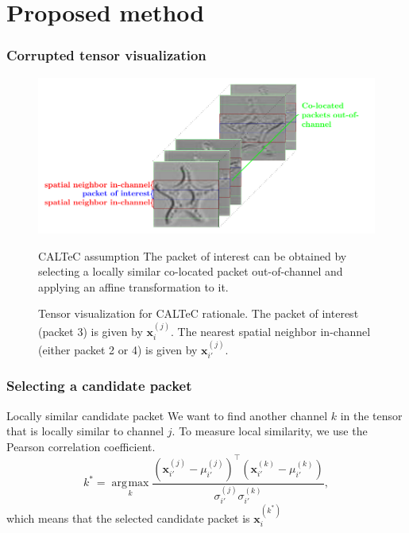 \documentclass[aspectratio=169]{beamer}
\DeclareMathOperator*{\argmax}{\arg\!\max}
\begin{document}
\section{Proposed method}

\begin{frame}
	\frametitle{Corrupted tensor visualization}
	\begin{figure}
		\begin{minipage}{.64\textwidth}
			\includegraphics[width=\linewidth]{tensorvizcaltec.pdf}
			\caption{Tensor visualization for CALTeC rationale. The packet of interest (packet 3) is given by $\mathbf{x}_i^{(j)}$. The nearest spatial neighbor in-channel (either packet 2 or 4) is given by $\mathbf{x}_{i'}^{(j)}$.}
		\end{minipage}\hfill
		\begin{minipage}{.32\textwidth}
				\begin{block}{CALTeC assumption}
		The packet of interest can be obtained by selecting a locally similar co-located packet out-of-channel and applying an affine transformation to it. 
	\end{block}
		\end{minipage}
	\end{figure}
\end{frame}

\begin{frame}
	\frametitle{Selecting a candidate packet}
	\begin{block}{Locally similar candidate packet}
		We want to find another channel $k$ in the tensor that is locally similar to channel $j$. To measure local similarity, we use the Pearson correlation coefficient.
		\[
		 k^* = \underset{k}{\argmax} \frac{\left(\mathbf{x}_{i'}^{(j)}-\mu_{i'}^{(j)}\right)^\top \left(\mathbf{x}_{i'}^{(k)}-\mu_{i'}^{(k)}\right)}{\sigma_{i'}^{(j)}\sigma_{i'}^{(k)}},
		\label{eq:Pearson_coefficient}
		\]
		which means that the selected candidate packet is $\mathbf{x}_i^{(k^*)}$
	\end{block}
\end{frame}
\end{document}
